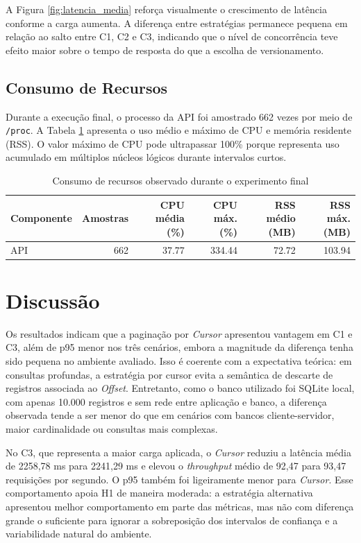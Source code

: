\documentclass[journal]{IEEEtran}
\begin{document}
A Figura \ref{fig:latencia_media} reforça visualmente o crescimento de latência conforme a carga aumenta. A diferença entre estratégias permanece pequena em relação ao salto entre C1, C2 e C3, indicando que o nível de concorrência teve efeito maior sobre o tempo de resposta do que a escolha de versionamento.

\subsection{Consumo de Recursos}

Durante a execução final, o processo da API foi amostrado 662 vezes por meio de \texttt{/proc}. A Tabela \ref{tab:resultados_recursos} apresenta o uso médio e máximo de CPU e memória residente (RSS). O valor máximo de CPU pode ultrapassar 100\% porque representa uso acumulado em múltiplos núcleos lógicos durante intervalos curtos.

\begin{table}[htbp]
\caption{Consumo de recursos observado durante o experimento final}
\label{tab:resultados_recursos}
\centering
\renewcommand{\arraystretch}{1.2}
\begin{tabularx}{\textwidth}{l r r r r r}
\toprule
\textbf{Componente} & \textbf{Amostras} & \textbf{CPU média (\%)} & \textbf{CPU máx. (\%)} & \textbf{RSS médio (MB)} & \textbf{RSS máx. (MB)} \\
\midrule
API & 662 & 37.77 & 334.44 & 72.72 & 103.94 \\
\bottomrule
\end{tabularx}
\end{table}


\section{Discussão}

Os resultados indicam que a paginação por \textit{Cursor} apresentou vantagem em C1 e C3, além de p95 menor nos três cenários, embora a magnitude da diferença tenha sido pequena no ambiente avaliado. Isso é coerente com a expectativa teórica: em consultas profundas, a estratégia por cursor evita a semântica de descarte de registros associada ao \textit{Offset}. Entretanto, como o banco utilizado foi SQLite local, com apenas 10.000 registros e sem rede entre aplicação e banco, a diferença observada tende a ser menor do que em cenários com bancos cliente-servidor, maior cardinalidade ou consultas mais complexas.

No C3, que representa a maior carga aplicada, o \textit{Cursor} reduziu a latência média de 2258,78 ms para 2241,29 ms e elevou o \textit{throughput} médio de 92,47 para 93,47 requisições por segundo. O p95 também foi ligeiramente menor para \textit{Cursor}. Esse comportamento apoia H1 de maneira moderada: a estratégia alternativa apresentou melhor comportamento em parte das métricas, mas não com diferença grande o suficiente para ignorar a sobreposição dos intervalos de confiança e a variabilidade natural do ambiente.
\end{document}
